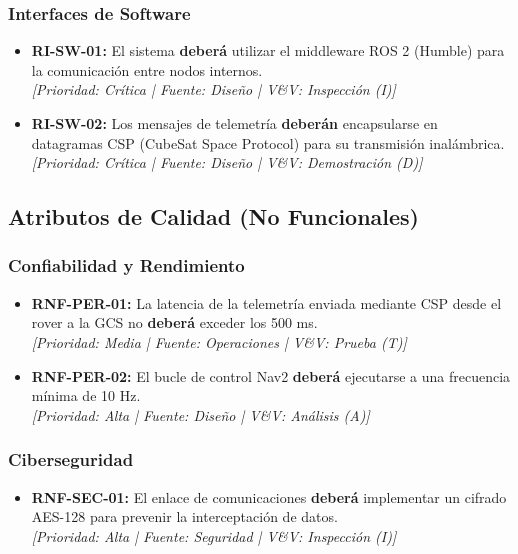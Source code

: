 \subsubsection{Interfaces de Software}
\begin{itemize}[label=---]
    \item \textbf{RI-SW-01:} El sistema \textbf{deberá} utilizar el middleware ROS 2 (Humble) para la comunicación entre nodos internos. \\
    \textit{[Prioridad: Crítica | Fuente: Diseño | V\&V: Inspección (I)]}
    \item \textbf{RI-SW-02:} Los mensajes de telemetría \textbf{deberán} encapsularse en datagramas CSP (CubeSat Space Protocol) para su transmisión inalámbrica. \\
    \textit{[Prioridad: Crítica | Fuente: Diseño | V\&V: Demostración (D)]}
\end{itemize}

\subsection{Atributos de Calidad (No Funcionales)}

\subsubsection{Confiabilidad y Rendimiento}
\begin{itemize}[label=---]
    \item \textbf{RNF-PER-01:} La latencia de la telemetría enviada mediante CSP desde el rover a la GCS no \textbf{deberá} exceder los 500 ms. \\
    \textit{[Prioridad: Media | Fuente: Operaciones | V\&V: Prueba (T)]}
    \item \textbf{RNF-PER-02:} El bucle de control Nav2 \textbf{deberá} ejecutarse a una frecuencia mínima de 10 Hz. \\
    \textit{[Prioridad: Alta | Fuente: Diseño | V\&V: Análisis (A)]}
\end{itemize}

\subsubsection{Ciberseguridad}
\begin{itemize}[label=---]
    \item \textbf{RNF-SEC-01:} El enlace de comunicaciones \textbf{deberá} implementar un cifrado AES-128 para prevenir la interceptación de datos. \\
    \textit{[Prioridad: Alta | Fuente: Seguridad | V\&V: Inspección (I)]}
\end{itemize}
